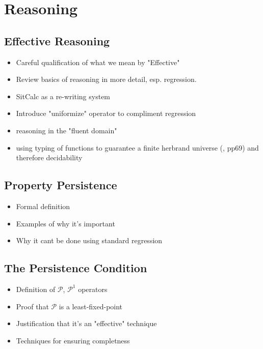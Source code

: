 \chapter{Reasoning}\label{ch:reasoning}

\section{Effective Reasoning}

\begin{itemize}
\item Careful qualification of what we mean by "Effective"
\item Review basics of reasoning in more detail, esp. regression.
\item SitCalc as a re-writing system
\item Introduce "uniformize" operator to compliment regression
\item reasoning in the "fluent domain"
\item using typing of functions to guarantee a finite herbrand universe (\cite{levesque04krr_book}, pp69) and therefore decidability
\end{itemize}

\section{Property Persistence}

\begin{itemize}
\item Formal definition
\item Examples of why it's important
\item Why it cant be done using standard regression
\end{itemize}

\section{The Persistence Condition}

\begin{itemize}
\item Definition of $\mathcal{P}$, $\mathcal{P}^{1}$ operators
\item Proof that $\mathcal{P}$ is a least-fixed-point
\item Justification that it's an "effective" technique
\item Techniques for ensuring completness
\end{itemize}

